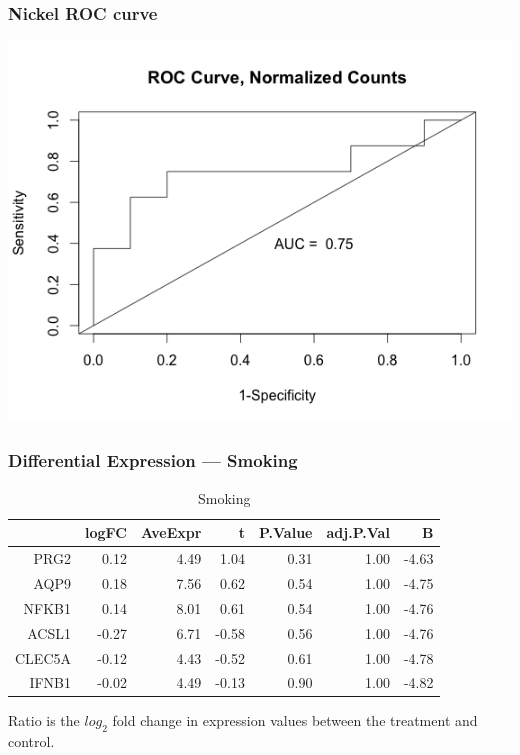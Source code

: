 \documentclass{beamer}
\begin{document}
\begin{frame}
	 \frametitle{Nickel ROC curve}
		\centering
	 	\includegraphics[scale=0.45]{../paper/figs/Nickel_ASCL1-APQ9.png} 
\end{frame}


\begin{frame}[fragile]
  	\frametitle{Differential Expression --- Smoking}
 		\begin{table}[ht]
		\caption {Smoking} \label{tab:smoking} 
		\centering
		\begin{tabular}{rrrrrrr}
 		 	\hline
 			& logFC & AveExpr & t & P.Value & adj.P.Val & B \\ 
 			 \hline
			PRG2 & 0.12 & 4.49 & 1.04 & 0.31 & 1.00 & -4.63 \\ 
  			AQP9 & 0.18 & 7.56 & 0.62 & 0.54 & 1.00 & -4.75 \\ 
  			NFKB1 & 0.14 & 8.01 & 0.61 & 0.54 & 1.00 & -4.76 \\ 
  			ACSL1 & -0.27 & 6.71 & -0.58 & 0.56 & 1.00 & -4.76 \\ 
  			CLEC5A & -0.12 & 4.43 & -0.52 & 0.61 & 1.00 & -4.78 \\ 
  			IFNB1 & -0.02 & 4.49 & -0.13 & 0.90 & 1.00 & -4.82 \\ 
  			\hline
		\end{tabular}
		\end{table}
		Ratio is the $log_{2}$ fold change in expression values between the treatment and control.
\end{frame}
\end{document}
